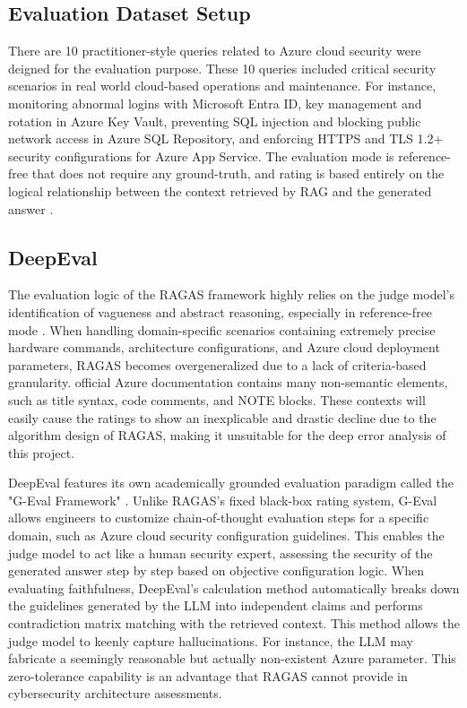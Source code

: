 \documentclass[11pt]{article}
\begin{document}
\subsection{Evaluation Dataset Setup}

There are 10 practitioner-style queries related to Azure cloud security were deigned for the evaluation purpose. These 10 queries included critical security scenarios in real world cloud-based operations and maintenance. For instance, monitoring abnormal logins with Microsoft Entra ID, key management and rotation in Azure Key Vault, preventing SQL injection and blocking public network access in Azure SQL Repository, and enforcing HTTPS and TLS 1.2+ security configurations for Azure App Service. The evaluation mode is reference-free that does not require any ground-truth, and rating is based entirely on the logical relationship between the context retrieved by RAG and the generated answer \citep{saad2024ares}.

\subsection{DeepEval}

The evaluation logic of the RAGAS framework highly relies on the judge model's identification of vagueness and abstract reasoning, especially in reference-free mode \citep{es2023ragas}. When handling domain-specific scenarios containing extremely precise hardware commands, architecture configurations, and Azure cloud deployment parameters, RAGAS becomes overgeneralized due to a lack of criteria-based granularity. official Azure documentation contains many non-semantic elements, such as title syntax, code comments, and NOTE blocks. These contexts will easily cause the ratings to show an inexplicable and drastic decline due to the algorithm design of RAGAS, making it unsuitable for the deep error analysis of this project.

DeepEval features its own academically grounded evaluation paradigm called the "G-Eval Framework" \citep{liu2023geval}. Unlike RAGAS's fixed black-box rating system, G-Eval allows engineers to customize chain-of-thought evaluation steps for a specific domain, such as Azure cloud security configuration guidelines. This enables the judge model to act like a human security expert, assessing the security of the generated answer step by step based on objective configuration logic. When evaluating faithfulness, DeepEval's calculation method automatically breaks down the guidelines generated by the LLM into independent claims and performs contradiction matrix matching with the retrieved context. This method allows the judge model to keenly capture hallucinations. For instance, the LLM may fabricate a seemingly reasonable but actually non-existent Azure parameter. This zero-tolerance capability is an advantage that RAGAS cannot provide in cybersecurity architecture assessments.
\end{document}

